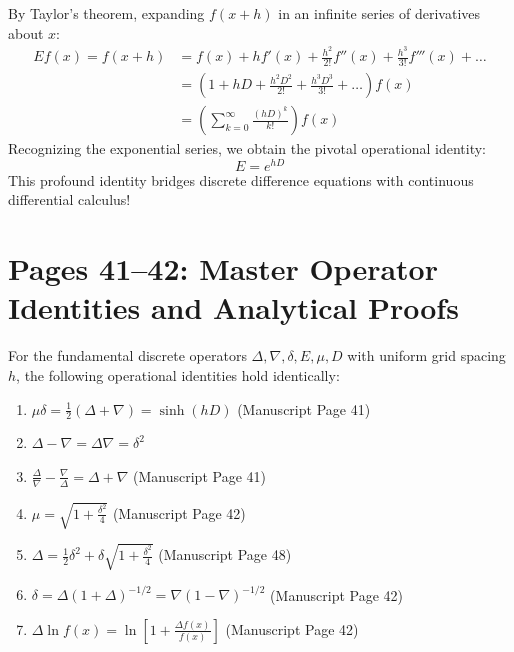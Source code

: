 \begin{theorembox}[Taylor Series and the Fundamental Relation $E = e^{hD}$]
By Taylor's theorem, expanding $f(x + h)$ in an infinite series of derivatives about $x$:
\begin{align}
    E f(x) = f(x + h) &= f(x) + h f'(x) + \frac{h^2}{2!} f''(x) + \frac{h^3}{3!} f'''(x) + \dots \nonumber \\
    &= \left( 1 + hD + \frac{h^2 D^2}{2!} + \frac{h^3 D^3}{3!} + \dots \right) f(x) \nonumber \\
    &= \left( \sum_{k=0}^\infty \frac{(hD)^k}{k!} \right) f(x)
\end{align}
Recognizing the exponential series, we obtain the pivotal operational identity:
\begin{equation}
    \boxed{E = e^{hD}}
\end{equation}
This profound identity bridges discrete difference equations with continuous differential calculus!
\end{theorembox}

\section{Pages 41--42: Master Operator Identities and Analytical Proofs}
\label{sec:operator_identities}

\begin{theorembox}
For the fundamental discrete operators $\Delta, \nabla, \delta, E, \mu, D$ with uniform grid spacing $h$, the following operational identities hold identically:
\begin{enumerate}[label=(\roman*),noitemsep]
    \item $\displaystyle \mu \delta = \frac{1}{2}(\Delta + \nabla) = \sinh(hD)$ \quad (Manuscript Page 41)
    \item $\displaystyle \Delta - \nabla = \Delta \nabla = \delta^2$
    \item $\displaystyle \frac{\Delta}{\nabla} - \frac{\nabla}{\Delta} = \Delta + \nabla$ \quad (Manuscript Page 41)
    \item $\displaystyle \mu = \sqrt{1 + \frac{\delta^2}{4}}$ \quad (Manuscript Page 42)
    \item $\displaystyle \Delta = \frac{1}{2}\delta^2 + \delta \sqrt{1 + \frac{\delta^2}{4}}$ \quad (Manuscript Page 48)
    \item $\displaystyle \delta = \Delta(1 + \Delta)^{-1/2} = \nabla(1 - \nabla)^{-1/2}$ \quad (Manuscript Page 42)
    \item $\displaystyle \Delta \ln f(x) = \ln\left[ 1 + \frac{\Delta f(x)}{f(x)} \right]$ \quad (Manuscript Page 42)
\end{enumerate}
\end{theorembox}

